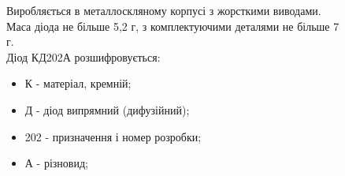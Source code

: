\documentclass[a4paper,14pt]{extreport}
\begin{document}
\begin{figure}
\vspace{-0.7 cm}
\parbox{12cm}{%
  \begin{tcolorbox}[width=12cm,right=0.5cm]
  Виробляється в металлоскляному корпусі з жорсткими виводами. Маса діода не більше 5,2 г, з комплектуючими деталями не більше 7 г.\\Діод КД202А розшифровується:
  \begin{itemize}
  \item К - матеріал, кремній; \item Д - діод випрямний (дифузійний); \item 202 - призначення і номер розробки; \item А - різновид;
  \end{itemize}
  \end{tcolorbox}}
\end{figure}
\end{document}
